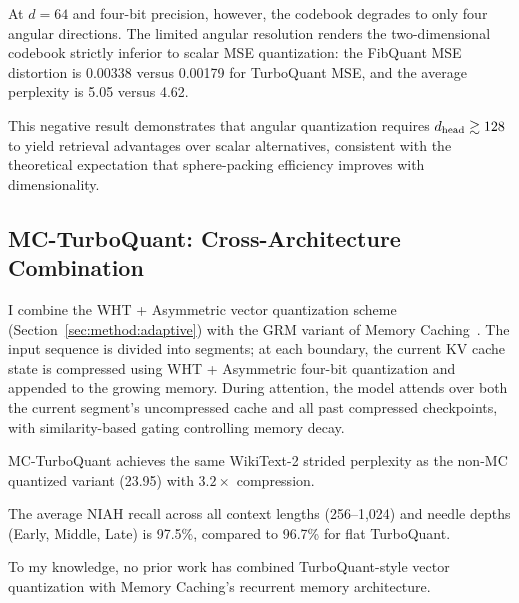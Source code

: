 At $d = 64$ and four-bit precision, however, the codebook degrades
to only four angular directions.
The limited angular resolution renders the two-dimensional codebook
strictly inferior to scalar MSE quantization: the FibQuant MSE distortion
is 0.00338 versus 0.00179 for TurboQuant MSE, and the average
perplexity is 5.05 versus 4.62.

This negative result demonstrates that angular quantization requires
$d_{\text{head}} \gtrsim 128$ to yield retrieval advantages over scalar
alternatives, consistent with the theoretical expectation that
sphere-packing efficiency improves with dimensionality.

\subsection{MC-TurboQuant: Cross-Architecture Combination}
\label{sec:method:mc}

I combine the WHT + Asymmetric vector quantization scheme
(Section~\ref{sec:method:adaptive}) with the GRM variant of
Memory Caching~\cite{behrouz2026mc}.
The input sequence is divided into segments; at each boundary, the
current KV cache state is compressed using WHT + Asymmetric four-bit
quantization and appended to the growing memory.
During attention, the model attends over both the current segment's
uncompressed cache and all past compressed checkpoints, with
similarity-based gating controlling memory decay.

MC-TurboQuant achieves the same WikiText-2 strided perplexity as the
non-MC quantized variant (23.95) with $3.2{\times}$ compression.

The average NIAH recall across all context lengths (256--1{,}024) and
needle depths (Early, Middle, Late) is 97.5\%, compared to 96.7\% for
flat TurboQuant.

To my knowledge, no prior work has combined TurboQuant-style vector
quantization with Memory Caching's recurrent memory architecture.

